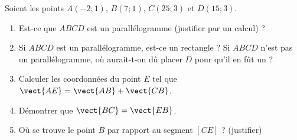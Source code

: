 
\begin{exercice}\label{exosmath-0669}

    Soient les points \( A(-2;1)\), \( B(7;1)\), \( C(25;3)\) et \( D(15;3)\).
    \begin{enumerate}
        \item
            Est-ce que \( ABCD\) est un parallélogramme (justifier par un calcul) ? 
        \item
            Si \( ABCD\) est un parallélogramme, est-ce un rectangle ? Si \( ABCD\) n'est pas un parallélogramme, où aurait-t-on dû placer \( D\) pour qu'il en fût un ?
        \item
            Calculer les coordonnées du point \( E\) tel que \( \vect{ AE }=\vect{ AB }+\vect{ CB }\).
        \item
            Démontrer que \( \vect{ BC }=\vect{ EB }\).
        \item
            Où se trouve le point \( B\) par rapport au segment \( [CE]\) ? (justifier)
    \end{enumerate}

\end{exercice}
